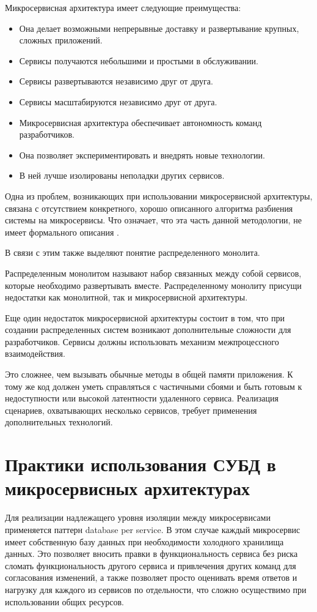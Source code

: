 Микросервисная архитектура имеет следующие преимущества:
\begin{itemize}
    \item Она делает возможными непрерывные доставку и развертывание крупных, сложных приложений.
    \item Сервисы получаются небольшими и простыми в обслуживании.
    \item Сервисы развертываются независимо друг от друга.
    \item Сервисы масштабируются независимо друг от друга.
    \item Микросервисная архитектура обеспечивает автономность команд разработчиков.
    \item Она позволяет экспериментировать и внедрять новые технологии.
    \item В ней лучше изолированы неполадки других сервисов.
\end{itemize}

Одна из проблем, возникающих при использовании микросервисной архитектуры, связана с отсутствием конкретного, хорошо описанного алгоритма разбиения
системы на микросервисы. 
Что означает, что эта часть данной методологии, не имеет формального описания \cite{micro-1}. 

В связи с этим также выделяют понятие распределенного монолита.

Распределенным монолитом называют набор связанных между собой сервисов, которые необходимо развертывать вместе. Распределенному монолиту присущи недостатки
как монолитной, так и микросервисной архитектуры.

Еще один недостаток микросервисной архитектуры состоит в том, что при создании
распределенных систем возникают дополнительные сложности для разработчиков. 
Сервисы должны использовать механизм межпроцессного взаимодействия.

Это сложнее, чем вызывать обычные методы в общей памяти приложения. 
К тому же код должен уметь
справляться с частичными сбоями и быть готовым к недоступности или высокой
латентности удаленного сервиса.
Реализация сценариев, охватывающих несколько сервисов, требует применения
дополнительных технологий. 

\section{Практики использования СУБД в микросервисных архитектурах}

Для реализации надлежащего уровня изоляции между микросервисами применяется паттерн database per service.
В этом случае каждый микросервис имеет собственную базу данных при необходимости холодного хранилища данных. 
Это позволяет вносить правки в функциональность сервиса без риска сломать функциональность другого сервиса и привлечения других команд для согласования изменений, 
а также позволяет просто оценивать время ответов и нагрузку для каждого из сервисов по отдельности, что сложно осуществимо при использовании общих ресурсов.

